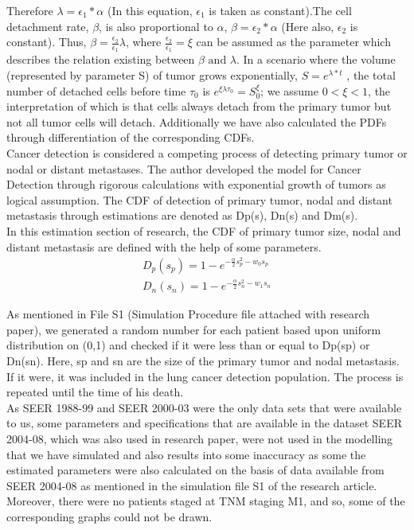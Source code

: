 \documentclass{article}
\begin{document}
	Therefore $\lambda = \epsilon_1 * \alpha$ (In this equation, $\epsilon_1 $ is taken as constant).The cell detachment rate, $\beta$, is also proportional to $\alpha$, $\beta = \epsilon_2 * \alpha$ (Here also,
	$\epsilon_2$ is constant). Thus, $\beta = \frac{\epsilon_2}{\epsilon_1} \lambda$, where $\frac{\epsilon_2}{\epsilon_1} = \xi$ can be assumed as the parameter which describes the relation existing between $\beta \text{ and } \lambda$. In a scenario where
	the volume (represented by parameter S) of tumor grows exponentially, $S=e^{\lambda * t}$ , the total number of detached cells before time $\tau_0$ is $e^{\xi \lambda \tau_0} = S_0^{\xi}$; we assume $0<\xi<1$, the interpretation of which is that cells always detach from the primary tumor but not all tumor cells will detach. Additionally we have also calculated the PDFs through differentiation of the corresponding CDFs.\\
	
	Cancer detection is considered a competing process of detecting primary tumor or nodal or distant metastases. The author developed the model for Cancer Detection through rigorous calculations with exponential growth of tumors as logical assumption. The CDF of detection of primary tumor, nodal and distant metastasis through estimations are denoted as Dp(s), Dn(s) and Dm(s).\\
	
	In this estimation section of research, the CDF of primary tumor size, nodal and distant metastasis are defined with the help of some parameters. \\ 
	\begin{align}
			D_{p} ( s_{p}) = 1 -  e^{-\frac{\alpha}{2} s_{p}^{2} -  w_{0} s_{p}} \\
            D_{n} ( s_{n}) = 1 -  e^{-\frac{\alpha}{2} s_{n}^{2} -  w_{1} s_{n}}
	\end{align}
   
	As mentioned in File S1 (Simulation Procedure file attached with research paper), we generated a random number for each patient based upon uniform distribution on (0,1) and checked if it were less than or equal to Dp(sp) or Dn(sn). Here, sp and sn are the size of the primary tumor and nodal metastasis. If it were, it was included in the lung cancer detection population. The process is repeated until the time of his death.\\

	
	As SEER 1988-99 and SEER 2000-03 were the only data sets that were available to us, some parameters and specifications that are available in the dataset SEER 2004-08, which was also used in research paper, were not used in the modelling that we have simulated and also results into some inaccuracy as some the estimated parameters were also calculated on the basis of data available from SEER 2004-08 as mentioned in the simulation file S1 of the research article. Moreover, there were no patients staged at TNM staging M1, and so, some of the corresponding graphs could not be drawn.\\
	
\end{document}
